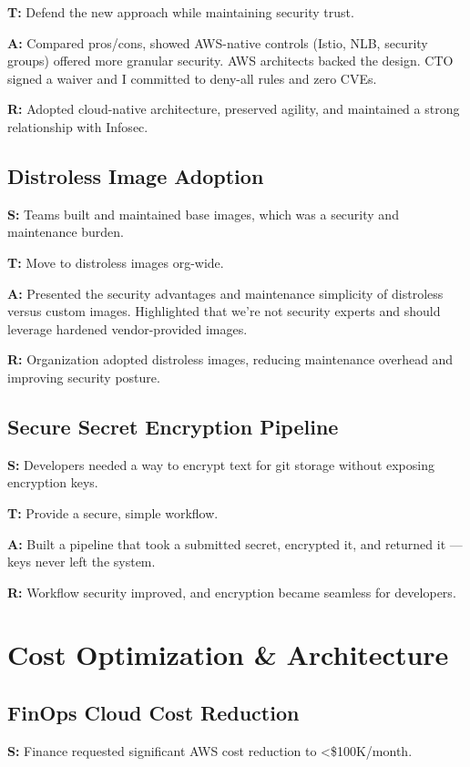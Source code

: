 \documentclass[11pt]{article}
\begin{document}
\textbf{T:} Defend the new approach while maintaining security trust.

\textbf{A:} Compared pros/cons, showed AWS-native controls (Istio, NLB, security groups) offered more granular security. AWS architects backed the design. CTO signed a waiver and I committed to deny-all rules and zero CVEs.

\textbf{R:} Adopted cloud-native architecture, preserved agility, and maintained a strong relationship with Infosec.

\subsection{Distroless Image Adoption}
\textbf{S:} Teams built and maintained base images, which was a security and maintenance burden.

\textbf{T:} Move to distroless images org-wide.

\textbf{A:} Presented the security advantages and maintenance simplicity of distroless versus custom images. Highlighted that we’re not security experts and should leverage hardened vendor-provided images.

\textbf{R:} Organization adopted distroless images, reducing maintenance overhead and improving security posture.

\subsection{Secure Secret Encryption Pipeline}
\textbf{S:} Developers needed a way to encrypt text for git storage without exposing encryption keys.

\textbf{T:} Provide a secure, simple workflow.

\textbf{A:} Built a pipeline that took a submitted secret, encrypted it, and returned it — keys never left the system.

\textbf{R:} Workflow security improved, and encryption became seamless for developers.

\section{Cost Optimization \& Architecture}

\subsection{FinOps Cloud Cost Reduction}
\textbf{S:} Finance requested significant AWS cost reduction to <\$100K/month.
\end{document}
